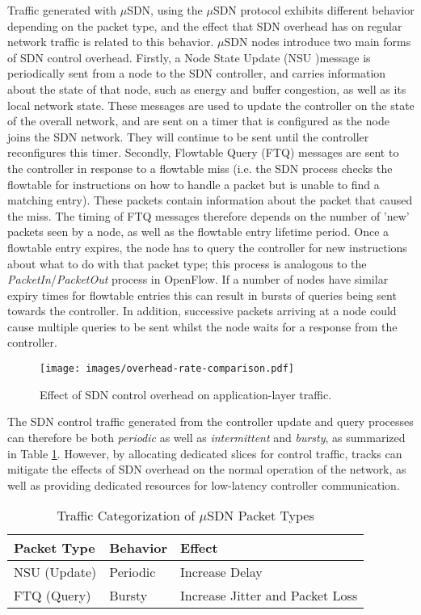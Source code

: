 Traffic generated with $\mu$SDN, using the $\mu$SDN protocol exhibits different behavior depending on the packet type, and the effect that SDN overhead has on regular network traffic is related to this behavior. $\mu$SDN nodes introduce two main forms of SDN control overhead. Firstly, a Node State Update (NSU )message is periodically sent from a node to the SDN controller, and carries information about the state of that node, such as energy and buffer congestion, as well as its local network state. These messages are used to update the controller on the state of the overall network, and are sent on a timer that is configured as the node joins the SDN network. They will continue to be sent until the controller reconfigures this timer. Secondly, Flowtable Query (FTQ) messages are sent to the controller in response to a flowtable miss (i.e. the SDN process checks the flowtable for instructions on how to handle a packet but is unable to find a matching entry). These packets contain information about the packet that caused the miss. The timing of FTQ messages therefore depends on the number of 'new' packets seen by a node, as well as the flowtable entry lifetime period. Once a flowtable entry expires, the node has to query the controller for new instructions about what to do with that packet type; this process is analogous to the \textit{PacketIn}/\textit{PacketOut} process in OpenFlow. If a number of nodes have similar expiry times for flowtable entries this can result in bursts of queries being sent towards the controller. In addition, successive packets arriving at a node could cause multiple queries to be sent whilst the node waits for a response from the controller. 

\begin{figure}[ht]
\centering
  \texttt{[image: images/overhead-rate-comparison.pdf]}
  \caption{Effect of SDN control overhead on application-layer traffic.}
  \label{fig:nsu_1min}
\end{figure}


The SDN control traffic generated from the controller update and query processes can therefore be both \textit{periodic} as well as \textit{intermittent} and \textit{bursty}, as summarized in Table \ref{table:usdn_traffic_characterization}. However, by allocating dedicated slices for control traffic, tracks can mitigate the effects of SDN overhead on the normal operation of the network, as well as providing dedicated resources for low-latency controller communication.

\begin{table}[ht]
	\renewcommand{\arraystretch}{1.0}
	\caption{Traffic Categorization of $\mu$SDN Packet Types} 
    \label{table:usdn_traffic_characterization}
	\centering
    \begin{tabular}{ |l|l|l| }
    \hline
      	\bfseries Packet Type & \bfseries Behavior & \bfseries Effect\\ \hline
		NSU (Update) & Periodic & Increase Delay \\ \hline
        FTQ (Query) & Bursty & Increase Jitter and Packet Loss \\ 
    \hline
    \end{tabular}
\end{table}


